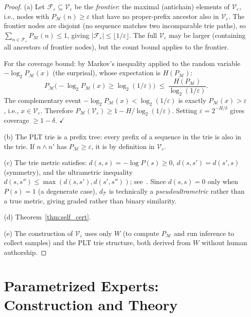 \documentclass[11pt]{article}
\begin{document}
\begin{proof}
(a) Let $\mathcal{F}_\varepsilon \subseteq \mathcal{V}_\varepsilon$ be the
\emph{frontier}: the maximal (antichain) elements of $\mathcal{V}_\varepsilon$,
i.e., nodes with $P_{\mathcal{M}}(n) \geq \varepsilon$ that have no proper-prefix
ancestor also in $\mathcal{V}_\varepsilon$.  The frontier nodes are disjoint
(no sequence matches two incomparable trie paths), so
$\sum_{n \in \mathcal{F}_\varepsilon} P_{\mathcal{M}}(n) \leq 1$, giving
$|\mathcal{F}_\varepsilon| \leq \lfloor 1/\varepsilon \rfloor$.
The full $\mathcal{V}_\varepsilon$ may be larger (containing all ancestors
of frontier nodes), but the count bound applies to the frontier.

For the coverage bound: by Markov's inequality applied to the random variable
$-\log_2 P_{\mathcal{M}}(x)$ (the surprisal), whose expectation is
$H(P_{\mathcal{M}})$:
\[
  P_{\mathcal{M}}\!\bigl(-\log_2 P_{\mathcal{M}}(x) \geq \log_2(1/\varepsilon)\bigr)
  \;\leq\; \frac{H(P_{\mathcal{M}})}{\log_2(1/\varepsilon)}.
\]
The complementary event $-\log_2 P_{\mathcal{M}}(x) < \log_2(1/\varepsilon)$
is exactly $P_{\mathcal{M}}(x) > \varepsilon$, i.e., $x \in \mathcal{V}_\varepsilon$.
Therefore $P_{\mathcal{M}}(\mathcal{V}_\varepsilon) \geq 1 - H/\log_2(1/\varepsilon)$.
Setting $\varepsilon = 2^{-H/\delta}$ gives coverage $\geq 1 - \delta$. $\checkmark$

(b) The PLT trie is a prefix tree: every prefix of a sequence in the trie is
also in the trie.  If $n \wedge n'$ has $P_{\mathcal{M}} \geq \varepsilon$,
it is by definition in $\mathcal{V}_\varepsilon$.

(c) The trie metric satisfies: $d(s,s) = -\log P(s) \geq 0$,
$d(s,s') = d(s',s)$ (symmetry), and the ultrametric inequality
$d(s,s'') \leq \max(d(s,s'), d(s',s''))$; see~\cite{plt2026}.
Since $d(s,s) = 0$ only when $P(s) = 1$ (a degenerate case), $d_{\mathcal{T}}$
is technically a \emph{pseudoultrametric} rather than a true metric, giving
graded rather than binary similarity.

(d) Theorem~\ref{thm:self_cert}.

(e) The construction of $\mathcal{V}_\varepsilon$ uses only $W$ (to compute
$P_{\mathcal{M}}$ and run inference to collect samples) and the PLT trie
structure, both derived from $W$ without human authorship.
\end{proof}

\section{Parametrized Experts: Construction and Theory}
\label{sec:experts}
\end{document}
